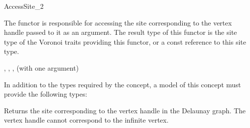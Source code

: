 

\begin{ccRefFunctionObjectConcept}{AccessSite_2}

The functor  is responsible for accessing the site
corresponding to the vertex handle passed to it as an argument. The
result type of this functor is the site type of the Voronoi traits
providing this functor, or a const reference to this site type.

\ccRefines
{}, , ,
 (with one argument)

\ccTypes

In addition to the types required by the 
concept, a model of this concept must provide the following types:



\ccOperations

\ccThreeToTwo
{}
{Returns the site corresponding to the vertex handle  in the
  Delaunay graph. The vertex handle  cannot correspond to the
  infinite vertex.}
%


\end{ccRefFunctionObjectConcept}
